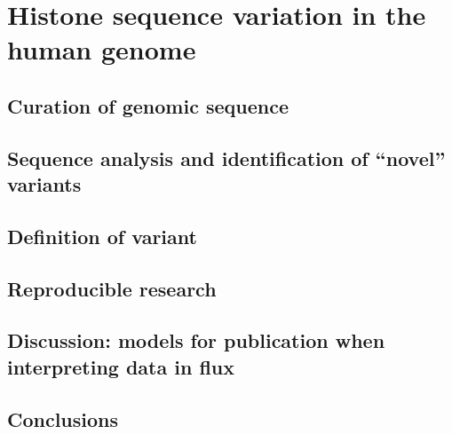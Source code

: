 \chapter{Histone sequence variation in the human genome}
\label{ch:catalog}

\section{Curation of genomic sequence}
\section{Sequence analysis and identification of ``novel'' variants}
\section{Definition of variant}
\section{Reproducible research}
\section{Discussion: models for publication when interpreting data in flux}
\section{Conclusions}
